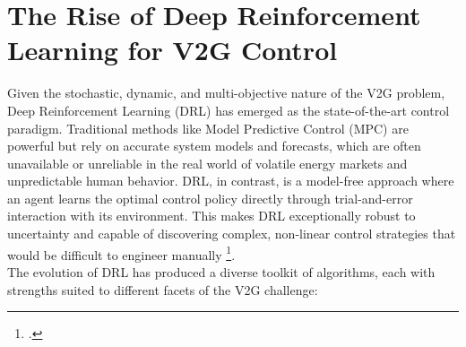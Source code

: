 \section{The Rise of Deep Reinforcement Learning for V2G Control}
Given the stochastic, dynamic, and multi-objective nature of the V2G problem, Deep Reinforcement Learning (DRL) has emerged as the state-of-the-art control paradigm. Traditional methods like Model Predictive Control (MPC) are powerful but rely on accurate system models and forecasts, which are often unavailable or unreliable in the real world of volatile energy markets and unpredictable human behavior. DRL, in contrast, is a model-free approach where an agent learns the optimal control policy directly through trial-and-error interaction with its environment. This makes DRL exceptionally robust to uncertainty and capable of discovering complex, non-linear control strategies that would be difficult to engineer manually \footcite{orfanoudakis2022deep, alfaverh2022optimal, kumar2024deep}.
\\
The evolution of DRL has produced a diverse toolkit of algorithms, each with strengths suited to different facets of the V2G challenge:
